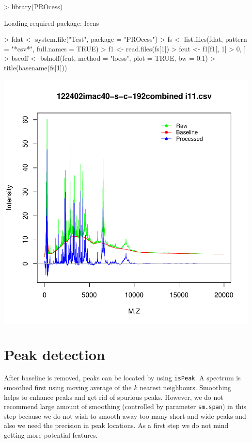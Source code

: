 \documentclass[12pt]{article}
\begin{document}
\begin{Schunk}
\begin{Sinput}
> library(PROcess)
\end{Sinput}
\begin{Soutput}
Loading required package: Icens 
\end{Soutput}
\begin{Sinput}
> fdat <- system.file("Test", package = "PROcess")
> fs <- list.files(fdat, pattern = "*csv*", full.names = TRUE)
> f1 <- read.files(fs[1])
> fcut <- f1[f1[, 1] > 0, ]
> bseoff <- bslnoff(fcut, method = "loess", plot = TRUE, bw = 0.1)
> title(basename(fs[1]))
\end{Sinput}
\end{Schunk}
\includegraphics{howtoprocess-bslnoffSingle}
\section{Peak detection}
After baseline is removed, peaks can be located by using
{\tt isPeak}. A spectrum is smoothed first using moving 
average of the $k$ nearest neighbours. Smoothing helps 
to enhance peaks and get rid of spurious peaks. However, we 
do not recommend large amount of smoothing (controlled by
parameter {\tt sm.span}) in this step because we do not 
wish to 
smooth away too many short and wide peaks 
and also we need the precision in peak locations. As a first step 
we do not mind getting more potential features. 
\end{document}
